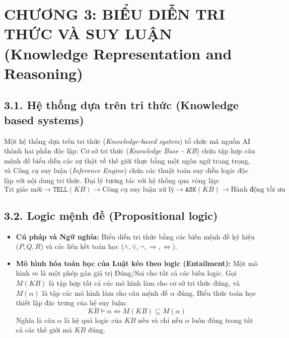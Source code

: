 \documentclass[../main.tex]{subfiles}
\begin{document}

\section{CHƯƠNG 3: BIỂU DIỄN TRI THỨC VÀ SUY LUẬN (Knowledge Representation and Reasoning)}

\subsection{3.1. Hệ thống dựa trên tri thức (Knowledge based systems)}
Một hệ thống dựa trên tri thức (\textit{Knowledge-based system}) tổ chức mã nguồn AI thành hai phần độc lập: Cơ sở tri thức (\textit{Knowledge Base - KB}) chứa tập hợp câu mệnh đề biểu diễn các sự thật về thế giới thực bằng một ngôn ngữ trang trọng, và Công cụ suy luận (\textit{Inference Engine}) chứa các thuật toán suy diễn logic độc lập với nội dung tri thức. Đại lý tương tác với hệ thống qua vòng lặp:
\begin{equation}
    \text{Tri giác mới} \xrightarrow{} \texttt{TELL}(KB) \xrightarrow{} \text{Công cụ suy luận xử lý} \xrightarrow{} \texttt{ASK}(KB) \rightarrow \text{Hành động tối ưu}
\end{equation}

\subsection{3.2. Logic mệnh đề (Propositional logic)}
\begin{itemize}
    \item \textbf{Cú pháp và Ngữ nghĩa:} Biểu diễn tri thức bằng các biến mệnh đề ký hiệu ($P, Q, R$) và các liên kết toán học ($\wedge, \vee, \neg, \Rightarrow, \Leftrightarrow$). 
    \item \textbf{Mô hình hóa toán học của Luật kéo theo logic (Entailment):} Một mô hình $m$ là một phép gán giá trị Đúng/Sai cho tất cả các biến logic. Gọi $M(KB)$ là tập hợp tất cả các mô hình làm cho cơ sở tri thức đúng, và $M(\alpha)$ là tập các mô hình làm cho câu mệnh đề $\alpha$ đúng. Biểu thức toán học thiết lập đặc trưng của hệ suy luận:
    \begin{equation}
        KB \models \alpha \iff M(KB) \subseteq M(\alpha)
    \end{equation}
    Nghĩa là câu $\alpha$ là hệ quả logic của $KB$ nếu và chỉ nếu $\alpha$ luôn đúng trong tất cả các thế giới mà $KB$ đúng.
\end{itemize}
\end{document}
